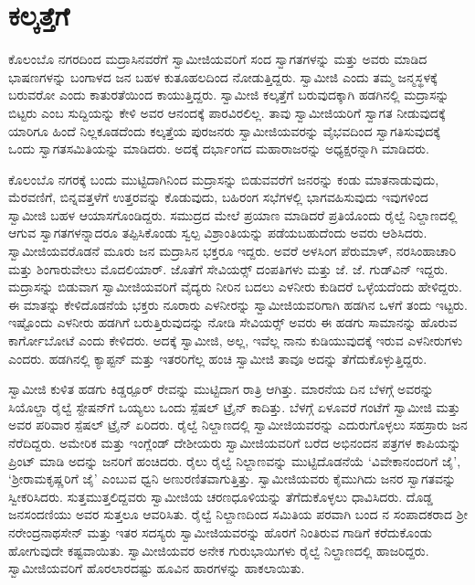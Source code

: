 
\chapter{ಕಲ್ಕತ್ತೆಗೆ}

 ಕೊಲಂಬೊ ನಗರದಿಂದ ಮದ್ರಾಸಿನವರೆಗೆ ಸ್ವಾಮೀಜಿಯವರಿಗೆ ಸಂದ ಸ್ವಾಗತಗಳನ್ನು ಮತ್ತು ಅವರು ಮಾಡಿದ ಭಾಷಣಗಳನ್ನು ಬಂಗಾಳದ ಜನ ಬಹಳ ಕುತೂಹಲದಿಂದ ನೋಡುತ್ತಿದ್ದರು. ಸ್ವಾಮೀಜಿ ಎಂದು ತಮ್ಮ ಜನ್ಮಸ್ಥಳಕ್ಕೆ ಬರುವರೋ ಎಂದು ಕಾತುರತೆಯಿಂದ ಕಾಯುತ್ತಿದ್ದರು. ಸ್ವಾಮೀಜಿ ಕಲ್ಕತ್ತೆಗೆ ಬರುವುದಕ್ಕಾಗಿ ಹಡಗಿನಲ್ಲಿ ಮದ್ರಾಸನ್ನು ಬಿಟ್ಟರು ಎಂಬ ಸುದ್ದಿಯನ್ನು ಕೇಳಿ ಅವರ ಆನಂದಕ್ಕೆ ಪಾರವಿರಲಿಲ್ಲ. ತಾವು ಸ್ವಾಮೀಜಿಯರಿಗೆ ಸ್ವಾಗತ ನೀಡುವುದಕ್ಕೆ ಯಾರಿಗೂ ಹಿಂದೆ ನಿಲ್ಲಕೂಡದೆಂದು ಕಲ್ಕತ್ತೆಯ ಪುರಜನರು ಸ್ವಾಮೀಜಿಯವರನ್ನು ವೈಭವದಿಂದ ಸ್ವಾಗತಿಸುವುದಕ್ಕೆ ಒಂದು ಸ್ವಾಗತಸಮಿತಿಯನ್ನು ಮಾಡಿದರು. ಅದಕ್ಕೆ ದರ್ಭಾಂಗದ ಮಹಾರಾಜರನ್ನು ಅಧ್ಯಕ್ಷರನ್ನಾಗಿ ಮಾಡಿದರು. 

 ಕೊಲಂಬೊ ನಗರಕ್ಕೆ ಬಂದು ಮುಟ್ಟಿದಾಗಿನಿಂದ ಮದ್ರಾಸನ್ನು ಬಿಡುವವರೆಗೆ ಜನರನ್ನು ಕಂಡು ಮಾತನಾಡುವುದು, ಮೆರವಣಿಗೆ, ಬಿನ್ನವತ್ತಳೆಗೆ ಉತ್ತರವನ್ನು ಕೊಡುವುದು, ಬಹಿರಂಗ ಸಭೆಗಳಲ್ಲಿ ಭಾಗವಹಿಸುವುದು ಇವುಗಳಿಂದ ಸ್ವಾಮೀಜಿ ಬಹಳ ಆಯಾಸಗೊಂಡಿದ್ದರು. ಸಮುದ್ರದ ಮೇಲೆ ಪ್ರಯಾಣ ಮಾಡಿದರೆ ಪ್ರತಿಯೊಂದು ರೈಲ್ವೆ ನಿಲ್ದಾಣದಲ್ಲಿ ಆಗುವ ಸ್ವಾಗತಗಳನ್ನಾದರೂ ತಪ್ಪಿಸಿಕೊಂಡು ಸ್ವಲ್ಪ ವಿಶ್ರಾಂತಿಯನ್ನು ಪಡೆಯಬಹುದೆಂದು ಅವರು ಆಶಿಸಿದರು. ಸ್ವಾಮೀಜಿಯವರೊಡನೆ ಮೂರು ಜನ ಮದ್ರಾಸಿನ ಭಕ್ತರೂ ಇದ್ದರು. ಅವರೆ ಅಳಸಿಂಗ ಪೆರುಮಾಳ್, ನರಸಿಂಹಾಚಾರಿ ಮತ್ತು ಶಿಂಗಾರುವೇಲು ಮೊದಲಿಯಾರ್. ಜೊತೆಗೆ ಸೇವಿಯರ್ಸ್‍‍ ದಂಪತಿಗಳು ಮತ್ತು ಜೆ. ಜೆ. ಗುಡ್‍ವಿನ್ ಇದ್ದರು. ಮದ್ರಾಸನ್ನು ಬಿಡುವಾಗ ಸ್ವಾಮೀಜಿಯವರಿಗೆ ವೈದ್ಯರು ನೀರಿನ ಬದಲು ಎಳನೀರು ಕುಡಿದರೆ ಒಳ್ಳೆಯದೆಂದು ಹೇಳಿದ್ದರು. ಈ ಮಾತನ್ನು ಕೇಳಿದೊಡನೆಯೆ ಭಕ್ತರು ನೂರಾರು ಎಳನೀರನ್ನು ಸ್ವಾಮೀಜಿಯವರಿಗಾಗಿ ಹಡಗಿನ ಒಳಗೆ ತಂದು ಇಟ್ಟರು. ಇಷ್ಟೊಂದು ಎಳನೀರು ಹಡಗಿಗೆ ಬರುತ್ತಿರುವುದನ್ನು ನೋಡಿ ಸೇವಿಯರ್ಸ್‍‍ ಅವರು ಈ ಹಡಗು ಸಾಮಾನನ್ನು ಹೊರುವ ಕಾರ್ಗೋಬೋಟೆ ಎಂದು ಕೇಳಿದರು. ಅದಕ್ಕೆ ಸ್ವಾಮೀಜಿ, ಅಲ್ಲ, ಇವೆಲ್ಲ ನಾನು ಕುಡಿಯುವುದಕ್ಕೆ ಇರುವ ಎಳನೀರುಗಳು ಎಂದರು. ಹಡಗಿನಲ್ಲಿ ಕ್ಯಾಪ್ಟನ್ ಮತ್ತು ಇತರರಿಗೆಲ್ಲ ಹಂಚಿ ಸ್ವಾಮೀಜಿ ತಾವೂ ಅದನ್ನು ತೆಗೆದುಕೊಳ್ಳುತ್ತಿದ್ದರು. 

 ಸ್ವಾಮೀಜಿ ಕುಳಿತ ಹಡಗು ಕಿಡ್ಡರ್‍ಪೂರ್ ರೇವನ್ನು ಮುಟ್ಟಿದಾಗ ರಾತ್ರಿ ಆಗಿತ್ತು. ಮಾರನೆಯ ದಿನ ಬೆಳಗ್ಗೆ ಅವರನ್ನು ಸಿಯೊಲ್ಡಾ ರೈಲ್ವೆ ಸ್ಟೇಷನ್‍ಗೆ ಒಯ್ಯಲು ಒಂದು ಸ್ಪೆಷಲ್ ಟ್ರೈನ್ ಕಾದಿತ್ತು. ಬೆಳಗ್ಗೆ ಏಳೂವರೆ ಗಂಟೆಗೆ ಸ್ವಾಮೀಜಿ ಮತ್ತು ಅವರ ಪರಿವಾರ ಸ್ಪೆಷಲ್ ಟ್ರೈನ್ ಏರಿದರು. ರೈಲ್ವೆ ನಿಲ್ದಾಣದಲ್ಲಿ ಸ್ವಾಮೀಜಿಯವರನ್ನು ಎದುರುಗೊಳ್ಳಲು ಸಹಸ್ರಾರು ಜನ ನೆರೆದಿದ್ದರು. ಅಮೇರಿಕ ಮತ್ತು ಇಂಗ್ಲೆಂಡ್ ದೇಶೀಯರು ಸ್ವಾಮೀಜಿಯವರಿಗೆ ಬರೆದ ಅಭಿನಂದನ ಪತ್ರಗಳ ಕಾಪಿಯನ್ನು ಪ್ರಿಂಟ್ ಮಾಡಿ ಅದನ್ನು ಜನರಿಗೆ ಹಂಚಿದರು. ರೈಲು ರೈಲ್ವೆ ನಿಲ್ದಾಣವನ್ನು ಮುಟ್ಟಿದೊಡನೆಯೆ ‘ವಿವೇಕಾನಂದರಿಗೆ ಜೈ’, ‘ಶ‍್ರೀರಾಮಕೃಷ್ಣರಿಗೆ ಜೈ’ ಎಂಬುವ ಧ್ವನಿ ಅಣುರಣಿತವಾಗುತ್ತಿತ್ತು. ಸ್ವಾಮೀಜಿಯವರು ಕೈಮುಗಿದು ಜನರ ಸ್ವಾಗತವನ್ನು ಸ್ವೀಕರಿಸಿದರು. ಸುತ್ತಮುತ್ತಲಿದ್ದವರು ಸ್ವಾಮೀಜಿಯ ಚರಣಧೂಳಿಯನ್ನು ತೆಗೆದುಕೊಳ್ಳಲು ಧಾವಿಸಿದರು. ದೊಡ್ಡ ಜನಸಂದಣಿಯು ಅವರ ಸುತ್ತಲೂ ಆವರಿಸಿತು. ರೈಲ್ವೆ ನಿಲ್ದಾಣದಿಂದ ಸಮಿತಿಯ ಪರವಾಗಿ ಬಂದ  ನ ಸಂಪಾದಕರಾದ ಶ‍್ರೀ ನರೇಂದ್ರನಾಥಸೇನ್ ಮತ್ತು ಇತರ ಸದಸ್ಯರು ಸ್ವಾಮೀಜಿಯವರನ್ನು ಹೊರಗೆ ನಿಂತಿರುವ ಗಾಡಿಗೆ ಕರೆದುಕೊಂಡು ಹೋಗುವುದೇ ಕಷ್ಟವಾಯಿತು. ಸ್ವಾಮೀಜಿಯವರ ಅನೇಕ ಗುರುಭಾಯಿಗಳು ರೈಲ್ವೆ ನಿಲ್ದಾಣದಲ್ಲಿ ಹಾಜರಿದ್ದರು. ಸ್ವಾಮೀಜಿಯವರಿಗೆ ಹೊರಲಾರದಷ್ಟು ಹೂವಿನ ಹಾರಗಳನ್ನು ಹಾಕಲಾಯಿತು. 

